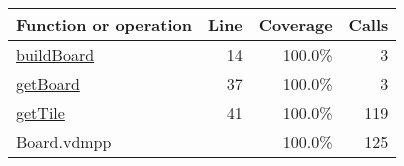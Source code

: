 \bigskip
\begin{longtable}{|l|r|r|r|}
\hline
Function or operation & Line & Coverage & Calls \\
\hline
\hline
\hyperref[buildBoard:14]{buildBoard} & 14&100.0\% & 3 \\
\hline
\hyperref[getBoard:37]{getBoard} & 37&100.0\% & 3 \\
\hline
\hyperref[getTile:41]{getTile} & 41&100.0\% & 119 \\
\hline
\hline
Board.vdmpp & & 100.0\% & 125 \\
\hline
\end{longtable}

